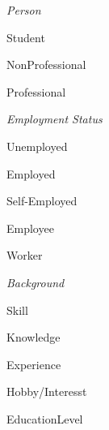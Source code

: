 \documentclass[english]{article}
\begin{document}
\begin{labelist}
    \item   
        \textit{Person}
        \begin{labelist}
            \item Student
            \item NonProfessional
            \item Professional
        \end{labelist}
    \item   
        \textit{Employment Status} \cite{employment_status_ref}
        \begin{labelist}
            \item Unemployed
            \item Employed
            	\begin{labelist}
                  \item Self-Employed
                  \item Employee
                  \item Worker
              \end{labelist}
        \end{labelist}
    \item   
        \textit{Background}
        \begin{labelist}
            \item Skill
            \item Knowledge
            \item Experience
            \item Hobby/Interesst \cite{hobbies_list_ref}
            \item EducationLevel
        \end{labelist}
   
\end{labelist} 

\vspace{5mm}


\end{document}
